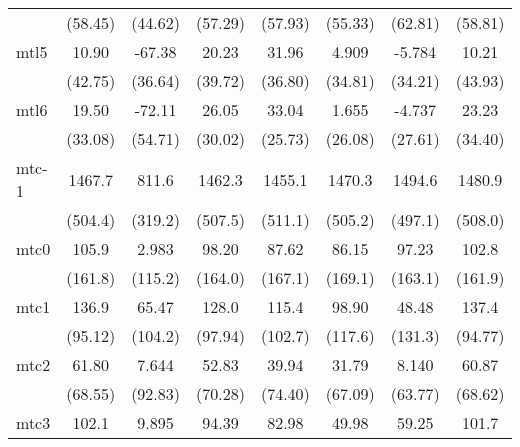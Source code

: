 \documentclass{article}
\begin{document}
{\begin{longtable}{l*{7}{c}}
                &  (58.45)         &  (44.62)         &  (57.29)         &  (57.93)         &  (55.33)         &  (62.81)         &  (58.81)         \\
mtl5            &    10.90         &   -67.38         &    20.23         &    31.96         &    4.909         &   -5.784         &    10.21         \\
                &  (42.75)         &  (36.64)         &  (39.72)         &  (36.80)         &  (34.81)         &  (34.21)         &  (43.93)         \\
mtl6            &    19.50         &   -72.11         &    26.05         &    33.04         &    1.655         &   -4.737         &    23.23         \\
                &  (33.08)         &  (54.71)         &  (30.02)         &  (25.73)         &  (26.08)         &  (27.61)         &  (34.40)         \\
mtc-1           &   1467.7\sym{**} &    811.6\sym{*}  &   1462.3\sym{**} &   1455.1\sym{**} &   1470.3\sym{**} &   1494.6\sym{**} &   1480.9\sym{**} \\
                &  (504.4)         &  (319.2)         &  (507.5)         &  (511.1)         &  (505.2)         &  (497.1)         &  (508.0)         \\
mtc0            &    105.9         &    2.983         &    98.20         &    87.62         &    86.15         &    97.23         &    102.8         \\
                &  (161.8)         &  (115.2)         &  (164.0)         &  (167.1)         &  (169.1)         &  (163.1)         &  (161.9)         \\
mtc1            &    136.9         &    65.47         &    128.0         &    115.4         &    98.90         &    48.48         &    137.4         \\
                &  (95.12)         &  (104.2)         &  (97.94)         &  (102.7)         &  (117.6)         &  (131.3)         &  (94.77)         \\
mtc2            &    61.80         &    7.644         &    52.83         &    39.94         &    31.79         &    8.140         &    60.87         \\
                &  (68.55)         &  (92.83)         &  (70.28)         &  (74.40)         &  (67.09)         &  (63.77)         &  (68.62)         \\
mtc3            &    102.1         &    9.895         &    94.39         &    82.98         &    49.98         &    59.25         &    101.7         \\

\end{longtable}}
\end{document}
